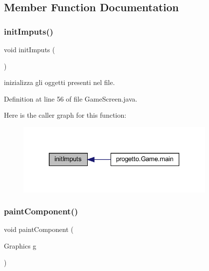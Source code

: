 \subsection{Member Function Documentation}
\mbox{\label{classprogetto_1_1_game_screen_a7427dec536138d79b67548cdacc03e4d}} 
\subsubsection{\texorpdfstring{init\+Imputs()}{initImputs()}}
{\footnotesize\ttfamily void init\+Imputs (\begin{DoxyParamCaption}{ }\end{DoxyParamCaption})}



inizializza gli oggetti presenti nel file. 



Definition at line 56 of file Game\+Screen.\+java.

Here is the caller graph for this function\+:\nopagebreak
\begin{figure}[H]
\begin{center}
\leavevmode
\includegraphics[width=280pt]{classprogetto_1_1_game_screen_a7427dec536138d79b67548cdacc03e4d_icgraph}
\end{center}
\end{figure}
\mbox{\label{classprogetto_1_1_game_screen_aac9233d06f3c093fc37139d7d2b258f6}} 
\subsubsection{\texorpdfstring{paint\+Component()}{paintComponent()}}
{\footnotesize\ttfamily void paint\+Component (\begin{DoxyParamCaption}\item[{Graphics}]{g }\end{DoxyParamCaption})}



